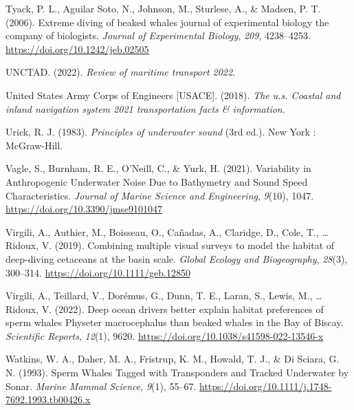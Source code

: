 \documentclass[
]{article}
\newlength{\cslhangindent}
\newlength{\cslentryspacingunit} %
\newenvironment{CSLReferences}[2] %
 {%
  \setlength{\parindent}{0pt}
  \ifodd #1
  \let\oldpar\par
  \def\par{\hangindent=\cslhangindent\oldpar}
  \fi
  \setlength{\parskip}{#2\cslentryspacingunit}
 }%
 {}
\begin{document}
\begin{CSLReferences}{1}{0}
\leavevmode{}%
Tyack, P. L., Aguilar Soto, N., Johnson, M., Sturlese, A., \& Madsen, P.
T. (2006). Extreme diving of beaked whales \textbar{} journal of
experimental biology \textbar{} the company of biologists. \emph{Journal
of Experimental Biology}, \emph{209}, 4238--4253.
\url{https://doi.org/10.1242/jeb.02505}

\leavevmode{}%
UNCTAD. (2022). \emph{Review of maritime transport 2022}.

\leavevmode{}%
United States Army Corps of Engineers {[}USACE{]}. (2018). \emph{The
u.s. Coastal and inland navigation system 2021 transportation facts \&
information}.

\leavevmode{}%
Urick, R. J. (1983). \emph{Principles of underwater sound} (3rd ed.).
New York : McGraw-Hill.

\leavevmode{}%
Vagle, S., Burnham, R. E., O'Neill, C., \& Yurk, H. (2021). Variability
in Anthropogenic Underwater Noise Due to Bathymetry and Sound Speed
Characteristics. \emph{Journal of Marine Science and Engineering},
\emph{9}(10), 1047. \url{https://doi.org/10.3390/jmse9101047}

\leavevmode{}%
Virgili, A., Authier, M., Boisseau, O., Cañadas, A., Claridge, D., Cole,
T., \ldots{} Ridoux, V. (2019). Combining multiple visual surveys to
model the habitat of deep-diving cetaceans at the basin scale.
\emph{Global Ecology and Biogeography}, \emph{28}(3), 300--314.
\url{https://doi.org/10.1111/geb.12850}

\leavevmode{}%
Virgili, A., Teillard, V., Dorémus, G., Dunn, T. E., Laran, S., Lewis,
M., \ldots{} Ridoux, V. (2022). Deep ocean drivers better explain
habitat preferences of sperm whales Physeter macrocephalus than beaked
whales in the Bay of Biscay. \emph{Scientific Reports}, \emph{12}(1),
9620. \url{https://doi.org/10.1038/s41598-022-13546-x}

\leavevmode{}%
Watkins, W. A., Daher, M. A., Fristrup, K. M., Howald, T. J., \& Di
Sciara, G. N. (1993). Sperm Whales Tagged with Transponders and Tracked
Underwater by Sonar. \emph{Marine Mammal Science}, \emph{9}(1), 55--67.
\url{https://doi.org/10.1111/j.1748-7692.1993.tb00426.x}


\end{CSLReferences}
\end{document}
